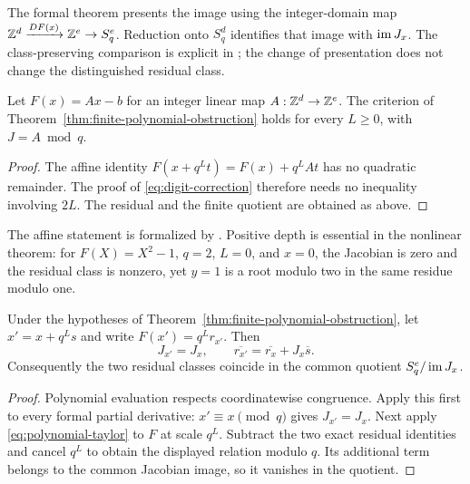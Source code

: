 The formal theorem
presents the image using the integer-domain map
$\mathbb Z^d\xrightarrow{DF(x)}\mathbb Z^e\to S_q^e$. Reduction onto $S_q^d$ identifies
that image with $\operatorname{im} J_x$. The class-preserving comparison is explicit in
; the change of
presentation does not change the distinguished residual class.

\begin{proposition}\label{prop:affine-obstruction}
Let $F(x)=Ax-b$ for an integer linear map $A:\mathbb Z^d\to\mathbb Z^e$. The criterion
of Theorem~\ref{thm:finite-polynomial-obstruction} holds for every $L\ge0$,
with $J=A\bmod q$.
\end{proposition}

\begin{proof}
The affine identity
$F(x+q^Lt)=F(x)+q^LAt$ has no quadratic remainder. The proof of
\eqref{eq:digit-correction} therefore needs no inequality involving $2L$.
The residual and the finite quotient are obtained as above.
\end{proof}

The affine statement is formalized by
.
Positive depth is essential in the nonlinear theorem: for $F(X)=X^2-1$,
$q=2$, $L=0$, and $x=0$, the Jacobian is zero and the residual class is
nonzero, yet $y=1$ is a root modulo two in the same residue modulo one.

\begin{proposition}
\label{prop:representative-independence}
Under the hypotheses of Theorem~\ref{thm:finite-polynomial-obstruction},
let $x'=x+q^Ls$ and write $F(x')=q^Lr_{x'}$. Then
\[
 J_{x'}=J_x,\qquad
 \overline{r_{x'}}=\overline{r_x}+J_x\overline s.
\]
Consequently the two residual classes coincide in the common quotient
$S_q^e/\operatorname{im} J_x$.
\end{proposition}

\begin{proof}
Polynomial evaluation respects coordinatewise congruence. Apply this first
to every formal partial derivative: $x'\equiv x\pmod q$ gives
$J_{x'}=J_x$. Next apply \eqref{eq:polynomial-taylor} to $F$ at scale $q^L$.
Subtract the two exact residual identities and cancel $q^L$ to obtain the
displayed relation modulo $q$. Its additional term belongs to the common
Jacobian image, so it vanishes in the quotient.
\end{proof}

